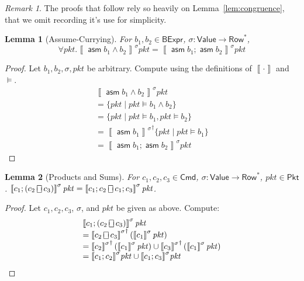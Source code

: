 \documentclass{article}
\newcommand{\pkt}{\mathit{pkt}}
\newcommand{\denote}[1]{\left\llbracket#1\right\rrbracket}
\newcommand{\Value}{\mathsf{Value}}
\newcommand{\BExpr}{\mathsf{BExpr}}
\newcommand{\Cmd}{\mathsf{Cmd}}
\newcommand{\Pkt}{\mathsf{Pkt}}
\newcommand{\Row}{\mathsf{Row}}
\newcommand{\assume}{\mathop{\mathsf{asm}}}
\newcommand{\choiceop}{\rotatebox[origin=c]{90}{$\sqsubset\!\!\!\sqsupset$}}
\newcommand{\choice}{\mathbin{\choiceop}}
\theoremstyle{plain}
\newtheorem{lemma}{Lemma}
\theoremstyle{definition}
\theoremstyle{remark}
\newtheorem{remark}{Remark}
\begin{document}
\begin{remark}
  The proofs that follow rely so heavily on Lemma~\ref{lem:congruence}, that we omit recording it's use for simplicity.
\end{remark}

\begin{lemma}[Assume-Currying]
  \label{lem:assume-currying}
  For $b_1,b_2 \in \BExpr$, $\sigma : \Value \to \Row^*$,
  \[\forall \pkt. \denote{\assume {b_1\wedge b_2}}^\sigma \pkt = \denote{\assume {b_1};\assume {b_2}}^\sigma \pkt\]
\end{lemma}
\begin{proof}
  Let $b_1,b_2,\sigma, \pkt$ be arbitrary. Compute using the definitions of $\denote\cdot$ and $\models$.
  \[\begin{array}{ll}
  \denote{\assume {b_1 \wedge b_2}}^\sigma \pkt \\
  = \{\pkt \mid \pkt \models b_1 \wedge b_2\} \\
  = \{\pkt \mid \pkt \models b_1, \pkt \models b_2\} \\
  = {\denote{\assume{b_1}}^\sigma}^\dagger\{\pkt \mid \pkt \models b_1\} \\
  = \denote{\assume{b_1}; \assume{b_2}}^\sigma \pkt
  \end{array}\]
\end{proof}


\begin{lemma}[Products and Sums]
  \label{lem:prod-sum}
  For $c_1,c_2, c_3 \in \Cmd$, $\sigma : \Value \to \Row^*$, $\pkt \in \Pkt$.
  $\denote{c_1;(c_2 \choice c_3)}^\sigma\pkt = \denote{c_1;c_2 \choice
    c_1;c_3}^\sigma\pkt$.
\end{lemma}
\begin{proof}
  Let $c_1,c_2,c_3$, $\sigma$, and $\pkt$ be given as above. Compute:
  \[
  \begin{array}{ll}
  \denote{c_1;(c_2 \choice c_3)}^\sigma \pkt \\
  = {\denote{c_2 \choice c_3}^\sigma}^\dagger\left(\denote{c_1}^\sigma\pkt\right) \\
  = {\denote{c_2}^\sigma}^\dagger\left(\denote{c_1}^\sigma \pkt\right)
  \cup {\denote{c_3}^\sigma}^\dagger\left(\denote{c_1}^\sigma \pkt\right) \\
  = {\denote{c_1;c_2}^\sigma}\pkt\cup {\denote{c_1;c_3}^\sigma}\pkt
  \end{array}
  \]
\end{proof}
\end{document}
